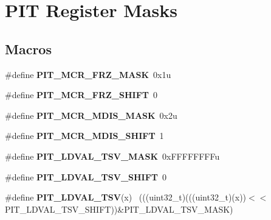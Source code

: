 \hypertarget{group___p_i_t___register___masks}{}\section{P\+I\+T Register Masks}
\label{group___p_i_t___register___masks}
\subsection*{Macros}
\begin{DoxyCompactItemize}
\item 
\hypertarget{group___p_i_t___register___masks_ga8149a0bb21843632dd4528b540480ba7}{}\#define {\bfseries P\+I\+T\+\_\+\+M\+C\+R\+\_\+\+F\+R\+Z\+\_\+\+M\+A\+S\+K}~0x1u\label{group___p_i_t___register___masks_ga8149a0bb21843632dd4528b540480ba7}

\item 
\hypertarget{group___p_i_t___register___masks_ga500ccd29eaebc20aa853e7bbb23e3c0c}{}\#define {\bfseries P\+I\+T\+\_\+\+M\+C\+R\+\_\+\+F\+R\+Z\+\_\+\+S\+H\+I\+F\+T}~0\label{group___p_i_t___register___masks_ga500ccd29eaebc20aa853e7bbb23e3c0c}

\item 
\hypertarget{group___p_i_t___register___masks_ga024258b2c23ff75f3e161e56adbbe733}{}\#define {\bfseries P\+I\+T\+\_\+\+M\+C\+R\+\_\+\+M\+D\+I\+S\+\_\+\+M\+A\+S\+K}~0x2u\label{group___p_i_t___register___masks_ga024258b2c23ff75f3e161e56adbbe733}

\item 
\hypertarget{group___p_i_t___register___masks_ga7ddcd16550ff71e4ee5ac48022ae6fb6}{}\#define {\bfseries P\+I\+T\+\_\+\+M\+C\+R\+\_\+\+M\+D\+I\+S\+\_\+\+S\+H\+I\+F\+T}~1\label{group___p_i_t___register___masks_ga7ddcd16550ff71e4ee5ac48022ae6fb6}

\item 
\hypertarget{group___p_i_t___register___masks_gab7929b3b8a0c170a50f57d97face5365}{}\#define {\bfseries P\+I\+T\+\_\+\+L\+D\+V\+A\+L\+\_\+\+T\+S\+V\+\_\+\+M\+A\+S\+K}~0x\+F\+F\+F\+F\+F\+F\+F\+Fu\label{group___p_i_t___register___masks_gab7929b3b8a0c170a50f57d97face5365}

\item 
\hypertarget{group___p_i_t___register___masks_ga463855d2b42de901bad9bea868f4f48b}{}\#define {\bfseries P\+I\+T\+\_\+\+L\+D\+V\+A\+L\+\_\+\+T\+S\+V\+\_\+\+S\+H\+I\+F\+T}~0\label{group___p_i_t___register___masks_ga463855d2b42de901bad9bea868f4f48b}

\item 
\hypertarget{group___p_i_t___register___masks_gad83c6bcd6b67260c3f41755dcd2734e0}{}\#define {\bfseries P\+I\+T\+\_\+\+L\+D\+V\+A\+L\+\_\+\+T\+S\+V}(x)                                              ~(((uint32\+\_\+t)(((uint32\+\_\+t)(x))$<$$<$P\+I\+T\+\_\+\+L\+D\+V\+A\+L\+\_\+\+T\+S\+V\+\_\+\+S\+H\+I\+F\+T))\&P\+I\+T\+\_\+\+L\+D\+V\+A\+L\+\_\+\+T\+S\+V\+\_\+\+M\+A\+S\+K)\label{group___p_i_t___register___masks_gad83c6bcd6b67260c3f41755dcd2734e0}


\end{DoxyCompactItemize}
